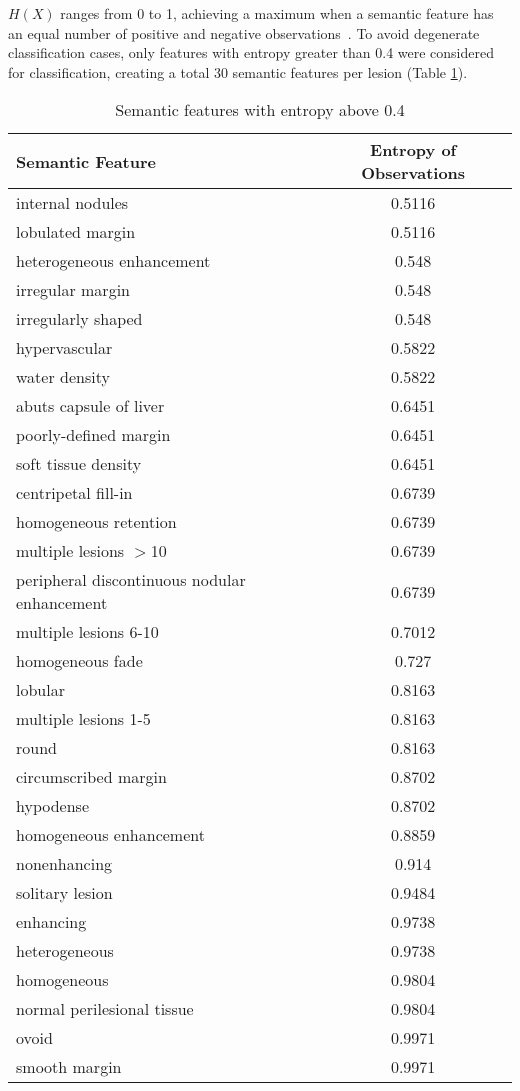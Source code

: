 $H(X)$ ranges from 0 to 1, achieving a maximum when a semantic feature has an equal number of positive and negative observations~\cite{MacKay:2003wc}.
To avoid degenerate classification cases, only features with entropy greater than 0.4 were considered for classification, creating a total 30 semantic features per lesion (Table \ref{table:semanticfeaturelist}).

\begin{table}[ht!]
	\centering
	\begin{tabular}{|l|c|}
		\hline
		Semantic Feature & Entropy of Observations \\ \hline \hline
		internal nodules & 0.5116 \\ \hline
		lobulated margin & 0.5116 \\ \hline
		heterogeneous enhancement & 0.548 \\ \hline
		irregular margin & 0.548 \\ \hline
		irregularly shaped & 0.548 \\ \hline
		hypervascular & 0.5822 \\ \hline
		water density & 0.5822 \\ \hline
		abuts capsule of liver & 0.6451 \\ \hline
		poorly-defined margin & 0.6451 \\ \hline
		soft tissue density & 0.6451 \\ \hline
		centripetal fill-in & 0.6739 \\ \hline
		homogeneous retention & 0.6739 \\ \hline
		multiple lesions $>$10 & 0.6739 \\ \hline
		peripheral discontinuous nodular enhancement & 0.6739 \\ \hline
		multiple lesions 6-10 & 0.7012 \\ \hline
		homogeneous fade & 0.727 \\ \hline
		lobular & 0.8163 \\ \hline
		multiple lesions 1-5 & 0.8163 \\ \hline
		round & 0.8163 \\ \hline
		circumscribed margin & 0.8702 \\ \hline
		hypodense & 0.8702 \\ \hline
		homogeneous enhancement & 0.8859 \\ \hline
		nonenhancing & 0.914 \\ \hline
		solitary lesion & 0.9484 \\ \hline
		enhancing & 0.9738 \\ \hline
		heterogeneous & 0.9738 \\ \hline
		homogeneous & 0.9804 \\ \hline
		normal perilesional tissue & 0.9804 \\ \hline
		ovoid & 0.9971 \\ \hline
		smooth margin & 0.9971 \\ \hline
	\end{tabular}
	\caption{Semantic features with entropy above 0.4}
	\label{table:semanticfeaturelist}
\end{table}



